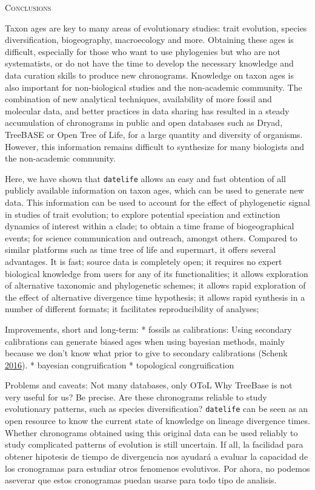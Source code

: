 \documentclass[]{article}
\begin{document}
\begin{center}
\textsc{Conclusions}
\end{center}

Taxon ages are key to many areas of evolutionary studies: trait evolution, species
diversification, biogeography, macroecology and more. Obtaining these ages is difficult,
especially for those who want to use phylogenies but who are not systematists, or
do not have the time to develop the necessary knowledge and data curation skills
to produce new chronograms. Knowledge on taxon ages is also important for non-biological
studies and the non-academic community.
The combination of new analytical techniques, availability of more fossil and molecular
data, and better practices in data sharing has resulted in a steady accumulation
of chronograms in public and open databases such as Dryad, TreeBASE or Open Tree
of Life, for a large quantity and diversity of organisms. However, this information
remains difficult to synthesize for many biologists and the non-academic community.

Here, we have shown that \texttt{datelife} allows
an easy and fast obtention of all publicly available information on taxon ages,
which can be used to generate new data.
This information can be used to account for the effect of phylogenetic signal in
studies of trait evolution; to explore potential speciation and extinction dynamics
of interest within a clade; to obtain a time frame of biogeographical events; for
science communication and outreach, amongst others.
Compared to similar platforms such as time tree of life
and supermart, it offers several advantages.
It is fast;
source data is completely open;
it requires no expert biological knowledge from users for any of its functionalities;
it allows exploration of alternative taxonomic and phylogenetic schemes;
it allows rapid exploration of the effect of alternative divergence time hypothesis;
it allows rapid synthesis in a number of different formats;
it facilitates reproducibility of analyses;

Improvements, short and long-term:
* fossils as calibrations: Using secondary calibrations can generate biased ages when using bayesian methods, mainly because we don't know what prior to give to secondary calibrations
(Schenk \protect\hyperlink{ref-Schenk2016}{2016}).
* bayesian congruification
* topological congruification

Problems and caveats:
Not many databases, only OToL
Why TreeBase is not very useful for us? Be precise.
Are these chronograms reliable to study evolutionary patterns, such as species diversification?
\texttt{datelife} can be seen as an open resource to know the current state of knowledge on lineage divergence times.
Whether chronograms obtained using this original data can be used reliably to study complicated patterns of evolution is still uncertain.
If all, la facilidad para obtener hipotesis de tiempo de divergencia nos ayudará a evaluar la capacidad de los cronogramas para estudiar otros fenomenos evolutivos.
Por ahora, no podemos aseverar que estos cronogramas puedan usarse para todo tipo de analisis.
\end{document}
